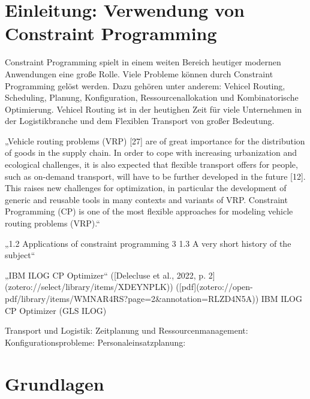 





\tableofcontents

\clearpage
{}


\section{Einleitung: Verwendung von Constraint Programming}
\label{sec:Einleitung: Verwendung von Constraint Programming}
Constraint Programming spielt in einem weiten Bereich heutiger modernen
Anwendungen eine große Rolle. Viele Probleme können durch Constraint Programming
gelöst werden. Dazu gehören unter anderem: Vehicel Routing, Scheduling, Planung,
Konfiguration, Ressourcenallokation und Kombinatorische Optimierung. Vehicel
Routing ist in der heutighen Zeit für viele Unternehmen in der Logistikbranche
und dem Flexiblen Transport von großer Bedeutung. \cite[1]{delec22jo}

„Vehicle routing problems (VRP) [27] are of great importance for the
distribution of goods in the supply chain. In order to cope with increasing
urbanization and ecological challenges, it is also expected that flexible
transport offers for people, such as on-demand transport, will have to be
further developed in the future [12]. This raises new challenges for
optimization, in particular the development of generic and reusable tools in
many contexts and variants of VRP. Constraint Programming (CP) is one of the
most flexible approaches for modeling vehicle routing problems (VRP).“
\cite[text]{delec22jo}

„1.2 Applications of constraint programming 3 1.3 A very short history of the
subject“ \cite[6]{aptjo}





„IBM ILOG CP Optimizer“ ([Delecluse et al., 2022, p.
2](zotero://select/library/items/XDEYNPLK))
([pdf](zotero://open-pdf/library/items/WMNAR4RS?page=2&annotation=RLZD4N5A)) IBM
ILOG CP Optimizer (GLS ILOG)


Transport und Logistik: Zeitplanung und Ressourcenmanagement:
Konfigurationsprobleme: Personaleinsatzplanung:

\cite[1-5]{rossi06bo}

\section{Grundlagen}
